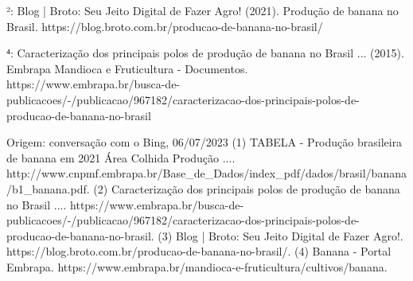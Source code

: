 ²: Blog | Broto: Seu Jeito Digital de Fazer Agro! (2021). Produção de banana no Brasil. https://blog.broto.com.br/producao-de-banana-no-brasil/

⁴: Caracterização dos principais polos de produção de banana no Brasil ... (2015). Embrapa Mandioca e Fruticultura - Documentos. https://www.embrapa.br/busca-de-publicacoes/-/publicacao/967182/caracterizacao-dos-principais-polos-de-producao-de-banana-no-brasil

Origem: conversação com o Bing, 06/07/2023
(1) TABELA - Produção brasileira de banana em 2021 Área Colhida Produção .... http://www.cnpmf.embrapa.br/Base_de_Dados/index_pdf/dados/brasil/banana/b1_banana.pdf.
(2) Caracterização dos principais polos de produção de banana no Brasil .... https://www.embrapa.br/busca-de-publicacoes/-/publicacao/967182/caracterizacao-dos-principais-polos-de-producao-de-banana-no-brasil.
(3) Blog | Broto: Seu Jeito Digital de Fazer Agro!. https://blog.broto.com.br/producao-de-banana-no-brasil/.
(4) Banana - Portal Embrapa. https://www.embrapa.br/mandioca-e-fruticultura/cultivos/banana.